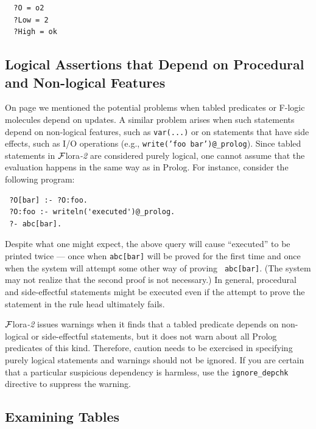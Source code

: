 \documentclass[11pt]{article}
\newcommand{\FLORA}{{\mbox{\sc ${\cal F}${lora}\rm\emph{-2}}}\xspace}
\begin{document}
\begin{itemize}
\begin{verbatim}
  ?O = o2
  ?Low = 2
  ?High = ok
\end{verbatim}

\end{itemize}



\subsection{Logical Assertions that Depend on Procedural and Non-logical Features}

On page \pageref{page-depchk} we mentioned the potential problems when
tabled predicates or F-logic molecules depend on updates. A similar problem
arises when such statements depend on non-logical features, such as
{\tt var(...)} or on statements that have side effects, such as I/O
operations (e.g., {\tt write('foo bar')@\_prolog}). Since tabled statements
in \FLORA are considered purely logical, one cannot assume that the
evaluation happens in the same way as in Prolog.
For instance, consider the following program:
\begin{verbatim}
 ?O[bar] :- ?O:foo.
 ?O:foo :- writeln('executed')@_prolog.  
 ?- abc[bar].
\end{verbatim}
Despite what one might expect, the above query will cause ``executed'' to
be printed twice --- once when {\tt abc[bar]} will be proved for the first
time and once when the system will attempt some other way of proving {\tt
  abc[bar]}. (The system may not realize that the second proof is not
necessary.) In general, procedural and side-effectful statements 
might be executed even if the attempt to prove the statement in the rule
head ultimately fails.

\FLORA issues warnings when it finds that a tabled predicate depends on
non-logical or side-effectful statements, but it does not warn about all
Prolog predicates of this kind. Therefore, caution needs to be exercised in
specifying purely logical statements and warnings should not be ignored.
If you are certain that a particular suspicious dependency
is harmless, use the {\tt ignore\_depchk} directive to suppress the warning.


\subsection{Examining Tables}
\end{document}
